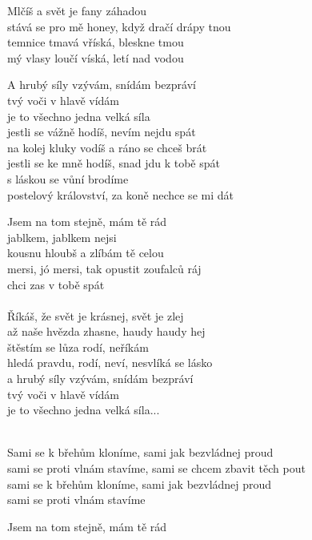 
\ve{}
Mlčíš a svět je fany záhadou\\
stává se pro mě honey, když dračí drápy tnou\\
temnice tmavá vříská, bleskne tmou\\
mý vlasy loučí víská, letí nad vodou

A hrubý síly vzývám, snídám bezpráví\\
tvý voči v hlavě vídám\\
je to všechno jedna velká síla\\
jestli se vážně hodíš, nevím nejdu spát\\
na kolej kluky vodíš a ráno se chceš brát\\
jestli se ke mně hodíš, snad jdu k tobě spát\\
s láskou se vůní brodíme\\
postelový království, za koně nechce se mi dát 

Jsem na tom stejně, mám tě rád\\
jablkem, jablkem nejsi\\
kousnu hloubš a zlíbám tě celou\\
mersi, jó mersi, tak opustit zoufalců ráj\\
chci zas v tobě spát\\

\re{}
\\

\ve{}
Říkáš, že svět je krásnej, svět je zlej\\
až naše hvězda zhasne, haudy haudy hej\\
štěstím se lůza rodí, neříkám\\
hledá pravdu, rodí, neví, nesvlíká se lásko\\
a hrubý síly vzývám, snídám bezpráví\\
tvý voči v hlavě vídám\\
je to všechno jedna velká síla...


\re{}
\\
 
Sami se k břehům kloníme, sami jak bezvládnej proud\\
sami se proti vlnám stavíme, sami se chcem zbavit těch pout\\
sami se k břehům kloníme, sami jak bezvládnej proud\\
sami se proti vlnám stavíme

Jsem na tom stejně, mám tě rád


\esong{}